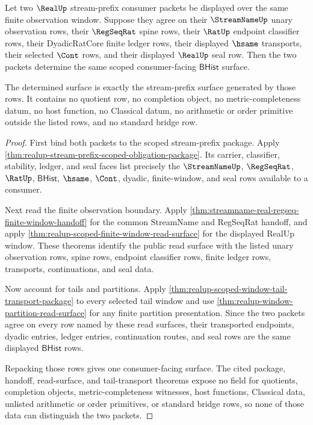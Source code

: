 \begin{theorem}
\label{thm:realup-stream-prefix-scoped-consumer-determinacy}
Let two $\RealUp$ stream-prefix consumer packets be displayed over the same
finite observation window. Suppose they agree on their $\StreamNameUp$ unary
observation rows, their $\RegSeqRat$ spine rows, their $\RatUp$ endpoint
classifier rows, their DyadicRatCore finite ledger rows, their displayed
$\hsame$ transports, their selected $\Cont$ rows, and their displayed
$\RealUp$ seal row. Then the two packets determine the same scoped
consumer-facing $\mathsf{BHist}$ surface.

The determined surface is exactly the stream-prefix surface generated by those
rows. It contains no quotient row, no completion object, no
metric-completeness datum, no host function, no Classical datum, no arithmetic
or order primitive outside the listed rows, and no standard bridge row.
\end{theorem}
\begin{proof}
First bind both packets to the scoped stream-prefix package. Apply
\autoref{thm:realup-stream-prefix-scoped-obligation-package}. Its carrier,
classifier, stability, ledger, and seal faces list precisely the
$\StreamNameUp$, $\RegSeqRat$, $\RatUp$, $\mathsf{BHist}$, $\hsame$, $\Cont$,
dyadic, finite-window, and seal rows available to a consumer.

Next read the finite observation boundary. Apply
\autoref{thm:streamname-real-regseq-finite-window-handoff} for the common
StreamName and RegSeqRat handoff, and apply
\autoref{thm:realup-scoped-finite-window-read-surface} for the displayed
RealUp window. These theorems identify the public read surface with the listed
unary observation rows, spine rows, endpoint classifier rows, finite ledger
rows, transports, continuations, and seal data.

Now account for tails and partitions. Apply
\autoref{thm:realup-scoped-window-tail-transport-package} to every selected
tail window and use \autoref{thm:realup-window-partition-read-surface} for any
finite partition presentation. Since the two packets agree on every row named
by these read surfaces, their transported endpoints, dyadic entries, ledger
entries, continuation routes, and seal rows are the same displayed
$\mathsf{BHist}$ rows.

Repacking those rows gives one consumer-facing surface. The cited package,
handoff, read-surface, and tail-transport theorems expose no field for
quotients, completion objects, metric-completeness witnesses, host functions,
Classical data, unlisted arithmetic or order primitives, or standard bridge
rows, so none of those data can distinguish the two packets.
\end{proof}

